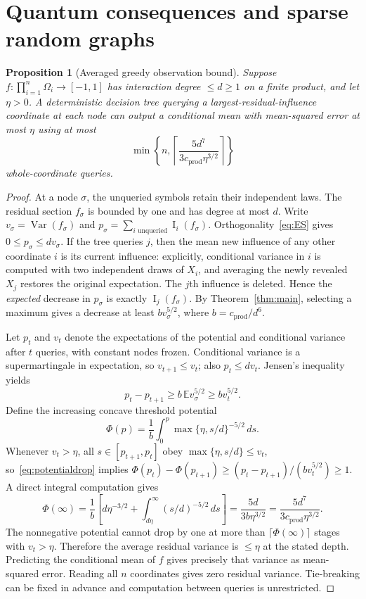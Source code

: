 \documentclass[11pt]{article}
\numberwithin{equation}{section}
\newtheorem{proposition}[theorem]{Proposition}
\theoremstyle{remark}
\newcommand{\E}{\mathbb E}
\newcommand{\Var}{\operatorname{Var}}
\newcommand{\Inf}{\operatorname{I}}
\newcommand{\cprod}{c_{\mathrm{prod}}}
\begin{document}
\section{Quantum consequences and sparse random graphs}\label{sec:queries}
\begin{proposition}[Averaged greedy observation bound]\label{prop:greedy}
Suppose $f:\prod_{i=1}^n\Omega_i\to[-1,1]$ has interaction degree $\le d\ge1$ on a finite product, and let $\eta>0$. A deterministic decision tree querying a largest-residual-influence coordinate at each node can output a conditional mean with mean-squared error at most $\eta$ using at most
\begin{equation}\label{eq:greedy}
 \min\left\{n,\left\lceil\frac{5d^7}{3\cprod\eta^{3/2}}\right\rceil\right\}
\end{equation}
whole-coordinate queries.
\end{proposition}
\begin{proof}
At a node $\sigma$, the unqueried symbols retain their independent laws. The residual section $f_\sigma$ is bounded by one and has degree at most $d$. Write $v_\sigma=\Var(f_\sigma)$ and $p_\sigma=\sum_{i\text{ unqueried}}\Inf_i(f_\sigma)$. Orthogonality~\eqref{eq:ES} gives $0\le p_\sigma\le d v_\sigma$. If the tree queries $j$, then the mean new influence of any other coordinate $i$ is its current influence: explicitly, conditional variance in $i$ is computed with two independent draws of $X_i$, and averaging the newly revealed $X_j$ restores the original expectation. The $j$th influence is deleted. Hence the \emph{expected} decrease in $p_\sigma$ is exactly $\Inf_j(f_\sigma)$. By Theorem~\ref{thm:main}, selecting a maximum gives a decrease at least
$b v_\sigma^{5/2}$, where $b=\cprod/d^6$.

Let $p_t$ and $v_t$ denote the expectations of the potential and conditional variance after $t$ queries, with constant nodes frozen. Conditional variance is a supermartingale in expectation, so $v_{t+1}\le v_t$; also $p_t\le d v_t$. Jensen's inequality yields
\begin{equation}\label{eq:potentialdrop}
 p_t-p_{t+1}\ge b\,\E v_\sigma^{5/2}\ge b v_t^{5/2}.
\end{equation}
Define the increasing concave threshold potential
\[
 \Phi(p)=\frac1b\int_0^p\max\{\eta,s/d\}^{-5/2}\,ds.
\]
Whenever $v_t>\eta$, all $s\in[p_{t+1},p_t]$ obey
$\max\{\eta,s/d\}\le v_t$, so~\eqref{eq:potentialdrop} implies
$\Phi(p_t)-\Phi(p_{t+1})\ge(p_t-p_{t+1})/(b v_t^{5/2})\ge1$.
A direct integral computation gives
\begin{equation}\label{eq:phi}
 \Phi(\infty)=\frac1b\left[d\eta^{-3/2}
 +\int_{d\eta}^\infty(s/d)^{-5/2}\,ds\right]
 =\frac{5d}{3b\eta^{3/2}}
 =\frac{5d^7}{3\cprod\eta^{3/2}}.
\end{equation}
The nonnegative potential cannot drop by one at more than $\lceil\Phi(\infty)\rceil$ stages with $v_t>\eta$. Therefore the average residual variance is $\le\eta$ at the stated depth. Predicting the conditional mean of $f$ gives precisely that variance as mean-squared error. Reading all $n$ coordinates gives zero residual variance. Tie-breaking can be fixed in advance and computation between queries is unrestricted.
\end{proof}
\end{document}
